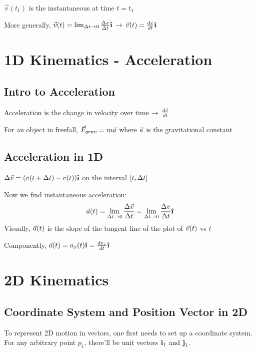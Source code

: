 \documentclass{report}
\begin{document}
$\vec{v}(t_1)$ is the instantaneous at time $t=t_1$

More generally, $\vec{v}(t) = \lim_{\Delta t \to 0} \frac{\Delta x}{\Delta t} \ihat$ $\rightarrow$ $\vec{v}(t) = \frac{dx}{dt} \ihat$ 

\newpage
\chapter{1D Kinematics - Acceleration}
\section{Intro to Acceleration}
Acceleration is the change in velocity over time $\rightarrow$ $\frac{d\vec{v}}{dt}$

For an object in freefall, $\vec{F}_{grav} = m\vec{a}$ where $\vec{a}$ is the gravitational constant


\section{Acceleration in 1D}
$\dlt \vel = (v (t + \dlt t) - v (t))\ihat$ on the interval $[t, \Delta t]$

Now we find instantaneous acceleration:
\begin{gather*}
  \acc (t) = \lim_{\dlt t \to 0} \frac{\dlt \vel}{\dlt t} = \lim_{\dlt t \to 0} \frac{\dlt v}{\dlt t} \ihat
\end{gather*}
Visually, $\vec{a} (t)$ is the slope of the tangent line of the plot of $\vec{v} (t)$ vs $t$

Componently, $\acc (t) = a_x(t) \ihat = \frac{dv_x}{dt} \ihat$

\newpage
\chapter{2D Kinematics}

\section{Coordinate System and Position Vector in 2D}
To represent 2D motion in vectors, one first needs to set up a coordinate system. For any arbitrary point $p_1$, there'll be unit vectors $\ihat_1$ and $\jhat_1$. 
\end{document}

